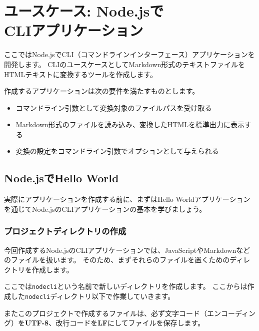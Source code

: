 \hypertarget{node-cli}{%
\chapter[ユースケース: Node.jsでCLIアプリケーション]{ユースケース: Node.jsで\\CLIアプリケーション}\label{node-cli}}
\thispagestyle{frontheadings}

ここではNode.jsでCLI（コマンドラインインターフェース）アプリケーションを開発します。
CLIのユースケースとしてMarkdown形式のテキストファイルをHTMLテキストに変換するツールを作成します。

作成するアプリケーションは次の要件を満たすものとします。

\begin{itemize}
\item
  コマンドライン引数として変換対象のファイルパスを受け取る
\item
  Markdown形式のファイルを読み込み、変換したHTMLを標準出力に表示する
\item
  変換の設定をコマンドライン引数でオプションとして与えられる
\end{itemize}

\hypertarget{hello-world-by-nodejs}{%
\section{Node.jsでHello World}\label{hello-world-by-nodejs}}

実際にアプリケーションを作成する前に、まずはHello
Worldアプリケーションを通じてNode.jsのCLIアプリケーションの基本を学びましょう。

\hypertarget{create-project}{%
\subsection{プロジェクトディレクトリの作成}\label{create-project}}

今回作成するNode.jsのCLIアプリケーションでは、JavaScriptやMarkdownなどのファイルを扱います。
そのため、まずそれらのファイルを置くためのディレクトリを作成します。

ここでは\texttt{nodecli}という名前で新しいディレクトリを作成します。
ここからは作成した\texttt{nodecli}ディレクトリ以下で作業していきます。

またこのプロジェクトで作成するファイルは、必ず文字コード（エンコーディング）を\textbf{UTF-8}、改行コードを\textbf{LF}にしてファイルを保存します。

